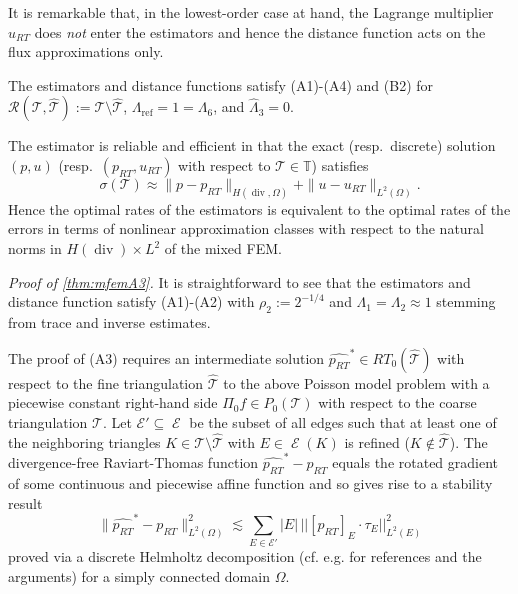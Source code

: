 \documentclass{siamltex1213}
\begin{document}
It is remarkable that, in the lowest-order case at hand, the Lagrange multiplier 
$u_{RT}$  does \textit{not} enter the estimators and hence the distance function acts on the flux approximations only. 

\begin{theorem}[(A1)-(A4)] \label{thm:mfemA3}
The estimators and distance functions satisfy (A1)-(A4) and (B2) for 
$\mathcal{R}({\mathcal{T}},{\hat{\mathcal{T}}}):={\mathcal{T}}\setminus{\hat{\mathcal{T}}}$, ${\ensuremath{\Lambda_{\mathrm{ref}}}}=1={\ensuremath{\Lambda_{\mathrm{6}}}}$, and ${\ensuremath{\widehat{\Lambda}_{\mathrm{3}}}} =0$. 
\end{theorem}

The estimator is reliable and efficient \cite{ccdpas2015} in that the exact (resp.\ discrete) solution $(p,u)$ (resp.\ $(p_{RT},u_{RT})$ with respect to ${\mathcal{T}}\in{\mathbb T}$) satisfies
\[
\sigma({\mathcal{T}})\approx \| p-p_{RT}\|_{H(\operatorname{div},\Omega)}+\| u-u_{RT}\|_{L^2(\Omega)}.
\] 
Hence the optimal rates of the estimators is equivalent to the optimal rates of the errors in terms of nonlinear approximation 
classes with respect to the natural norms in $H(\operatorname{div})\times L^2$ of the mixed FEM.

\textit{Proof of \cref{thm:mfemA3}.}
It is straightforward to see that the estimators and distance function satisfy (A1)-(A2)
with $\rho_2:=2^{-1/4}$ and ${\ensuremath{\Lambda_{\mathrm{1}}}}={\ensuremath{\Lambda_{\mathrm{2}}}}\approx 1$ stemming from trace 
and inverse estimates.

The proof of (A3) requires an intermediate solution ${\widehat{p_{RT}}}^*\in RT_0({\hat{\mathcal{T}}})$ with respect to the fine 
triangulation ${\hat{\mathcal{T}}}$ to the  above  Poisson model problem with a piecewise constant right-hand side 
$\Pi_0 f\in P_0({\mathcal{T}})$ with respect to the coarse triangulation ${\mathcal{T}}$.
Let $\mathcal{E}'\subseteq \operatorname{\mathcal{E}}$ be the subset of all edges 
such that at least one of the neighboring triangles
$K\in{\mathcal{T}}\setminus{\hat{\mathcal{T}}}$ with $E\in\operatorname{\mathcal{E}}(K)$ is refined ($K\notin{\hat{\mathcal{T}}}$).
The  divergence-free Raviart-Thomas function ${\widehat{p_{RT}}}^*-{p_{RT}}$ equals the rotated gradient
of some continuous and piecewise affine function and so gives rise to a stability result
\begin{equation}\label{stabilityintermediate}
\|   {\widehat{p_{RT}}}^*-{p_{RT}}\|^2_{L^2(\Omega)}  \lesssim  \sum_{E\in \mathcal{E}'} |E|\, ||[{p_{RT}}]_E\cdot\tau_E ||_{L^2(E)}^2
\end{equation}
proved via a discrete Helmholtz decomposition (cf. e.g. \cite[Thm 5.6]{LCMHJX} for 
references and the arguments) for a simply connected domain $\Omega$.  
\end{document}
